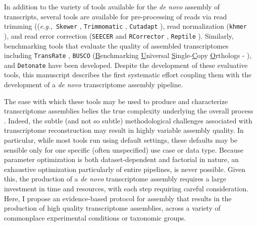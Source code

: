 \documentclass[10pt,letterpaper]{article}
\newcommand{\tit}{\textit}
\newcommand{\eg}{\textit{e.g.,}}
\begin{document}
In addition to the variety of tools available for the \tit{de novo} assembly of transcripts, several tools are available for pre-processing of reads via read trimming ((\eg\ \texttt{Skewer} \citep{Jiang:2014cx}, \texttt{Trimmomatic} \citep{Bolger:2014ek}, \texttt{Cutadapt} \cite{Martin:2011va}), read normalization (\texttt{khmer} \citep{Pell:2012id}), and read error correction (\texttt{SEECER} \citep{Le:2013dy} and \texttt{RCorrector} \citep{Song:2015in}, \texttt{Reptile} \cite{Yang:2010kv}). Similarly, benchmarking tools that evaluate the quality of assembled transcriptomes including \texttt{TransRate} \citep{SmithUnna:2016go}, \texttt{BUSCO} (\underline{B}enchmarking \underline{U}niversal \underline{S}ingle-\underline{C}opy \underline{O}rthologs - \citep{Simao:2015kk}), and \texttt{Detonate} \citep{Li:2014cm} have been developed. Despite the development of these evaluative tools, this manuscript describes the first systematic effort coupling them with the development of a \textit{de novo} transcriptome assembly pipeline.

The ease with which these tools may be used to produce and characterize transcriptome assemblies belies the true complexity underlying the overall process \citep{Ungaro:2017kf, Wang:2017gc, Moreton:2015fw, Yang:2013iz}. Indeed, the subtle (and not so subtle) methodological challenges associated with transcriptome reconstruction may result in highly variable assembly quality. In particular, while most tools run using default settings, these defaults may be sensible only for one specific (often unspecified) use case or data type. Because parameter optimization is both dataset-dependent and factorial in nature, an exhaustive optimization particularly of entire pipelines, is never possible. Given this, the production of a \tit{de novo} transcriptome assembly requires a large investment in time and resources, with each step requiring careful consideration. Here, I propose an evidence-based protocol for assembly that results in the production of high quality transcriptome assemblies, across a variety of commonplace experimental conditions or taxonomic groups. \\
\end{document}
